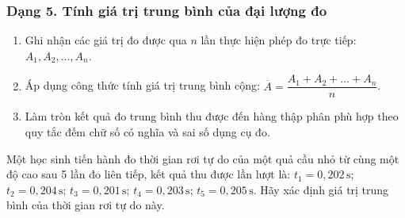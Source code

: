 \subsubsection{Dạng 5. Tính giá trị trung bình của đại lượng đo}
\begin{phuongphap}
\begin{enumerate}
\item Ghi nhận các giá trị đo được qua $n$ lần thực hiện phép đo trực tiếp: $A_1, A_2, \dots, A_n$.
\item Áp dụng công thức tính giá trị trung bình cộng: $\overline{A} = \dfrac{A_1 + A_2 + \dots + A_n}{n}$.
\item Làm tròn kết quả đo trung bình thu được đến hàng thập phân phù hợp theo quy tắc đếm chữ số có nghĩa và sai số dụng cụ đo.
\end{enumerate}
\end{phuongphap}
\begin{vidumau}
Một học sinh tiến hành đo thời gian rơi tự do của một quả cầu nhỏ từ cùng một độ cao sau 5 lần đo liên tiếp, kết quả thu được lần lượt là: $t_1 = 0,202\,\mathrm{s}$; $t_2 = 0,204\,\mathrm{s}$; $t_3 = 0,201\,\mathrm{s}$; $t_4 = 0,203\,\mathrm{s}$; $t_5 = 0,205\,\mathrm{s}$. Hãy xác định giá trị trung bình của thời gian rơi tự do này.
\end{vidumau}

